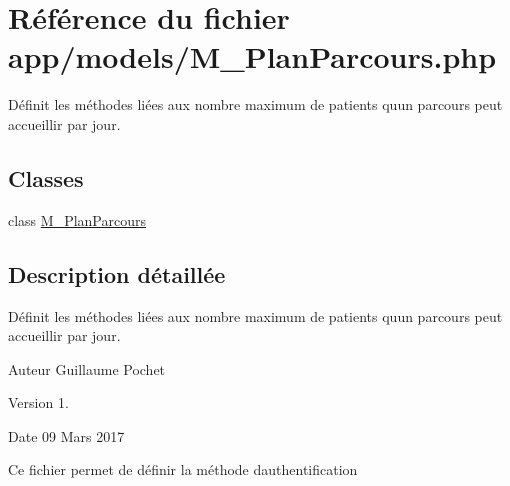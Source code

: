 \hypertarget{_m___plan_parcours_8php}{}\section{Référence du fichier app/models/\+M\+\_\+\+Plan\+Parcours.php}
\label{_m___plan_parcours_8php}


Définit les méthodes liées aux nombre maximum de patients qu\textquotesingle{}un parcours peut accueillir par jour.  


\subsection*{Classes}
\begin{DoxyCompactItemize}
\item 
class \hyperlink{class_m___plan_parcours}{M\+\_\+\+Plan\+Parcours}
\end{DoxyCompactItemize}


\subsection{Description détaillée}
Définit les méthodes liées aux nombre maximum de patients qu\textquotesingle{}un parcours peut accueillir par jour. 

\begin{DoxyAuthor}{Auteur}
Guillaume Pochet 
\end{DoxyAuthor}
\begin{DoxyVersion}{Version}
1. 
\end{DoxyVersion}
\begin{DoxyDate}{Date}
09 Mars 2017
\end{DoxyDate}
Ce fichier permet de définir la méthode d\textquotesingle{}authentification 